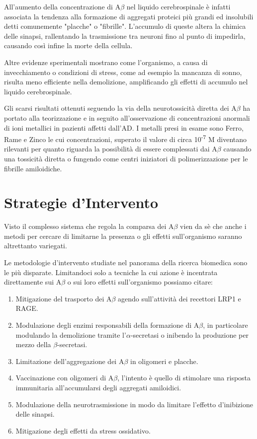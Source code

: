 \documentclass[a4paper, 12pt]{article}
\begin{document}
All'aumento della concentrazione di A$\beta$ nel liquido cerebrospinale è infatti associata la tendenza alla formazione di aggregati proteici più grandi ed insolubili detti comunemente "placche" o "fibrille".
L'accumulo di queste altera la chimica delle sinapsi, rallentando la trasmissione tra neuroni fino al punto di impedirla, causando così infine la morte della cellula.

Altre evidenze sperimentali mostrano come l’organismo, a causa di invecchiamento o condizioni di stress, come ad esempio la mancanza di sonno, risulta meno efficiente nella demolizione, amplificando gli effetti di accumulo nel liquido cerebrospinale.

Gli scarsi risultati ottenuti seguendo la via della neurotossicità diretta dei A$\beta$ ha portato alla teorizzazione e in seguito all’osservazione di concentrazioni anormali di ioni metallici in pazienti affetti dall'AD. I metalli presi in esame sono Ferro, Rame e Zinco le cui concentrazioni, superato il valore di circa 10\textsuperscript{-7}  M diventano rilevanti per quanto riguarda la possibilità di essere complessati dai A$\beta$ causando una tossicità diretta o fungendo come centri iniziatori di polimerizzazione per le fibrille amiloidiche.\cite{kepp_bioinorganic_2012}

\section{Strategie d'Intervento}
Visto il complesso sistema che regola la comparsa dei A$\beta$ vien da sè che anche i metodi per cercare di limitarne la presenza o gli effetti sull'organismo saranno altrettanto variegati.

Le metodologie d'intervento studiate nel panorama della ricerca biomedica sono le più disparate. Limitandoci solo a tecniche la cui azione è incentrata direttamente sui A$\beta$ o sui loro effetti sull'organismo possiamo citare:\cite{kumar_review_2015}
\begin{enumerate}
	\item Mitigazione del trasporto dei A$\beta$ agendo sull'attività dei recettori LRP1 e RAGE.
	\item Modulazione degli enzimi responsabili della formazione di A$\beta$, in particolare modulando la demolizione tramite l'$\alpha$-secretasi o inibendo la produzione per mezzo della $\beta$-secretasi.
	\item Limitazione dell'aggregazione dei A$\beta$ in oligomeri e placche.
	\item Vaccinazione con oligomeri di A$\beta$, l'intento è quello di stimolare una risposta immunitaria all'accumularsi degli aggregati amiloidici.
	\item Modulazione della neurotrasmissione in modo da limitare l'effetto d'inibizione delle sinapsi.
	\item Mitigazione degli effetti da stress ossidativo.
\end{enumerate}
\end{document}
